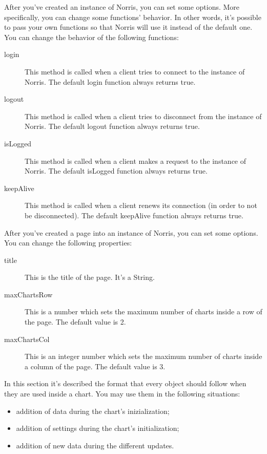  \label{sec:ObjectsDescription}
	 \label{sec:ObjectsDescriptionNorris}
		After you've created an instance of Norris, you can set some options. More specifically, you can change some functions' behavior. In other words, it's possible to pass your own functions so that Norris will use it instead of the default one.\\
		You can change the behavior of the following functions:
		\begin{description}
			\item[login] This method is called when a client tries to connect to the instance of Norris. The default login function always returns true.
			\item[logout] This method is called when a client tries to disconnect from the instance of Norris. The default logout function always returns true.
			\item[isLogged] This method is called when a client makes a request to the instance of Norris. The default isLogged function always returns true.
			\item[keepAlive] This method is called when a client renews its connection (in order to not be disconnected). The default keepAlive function always returns true.
		\end{description}
		After you've created a page into an instance of Norris, you can set some options. You can change the following properties:
		\begin{description}
			\item[title] This is the title of the page. It's a String.
			\item[maxChartsRow] This is a number which sets the maximum number of charts inside a row of the page. The default value is 2.
			\item[maxChartsCol] This is an integer number which sets the maximum number of charts inside a column of the page. The default value is 3.
		\end{description}
	 \label{sec:ObjectsDescriptionCharts}
		In this section it's described the format that every  object should follow when they are used inside a chart. You may use them in the following situations:
		\begin{itemize}
			\item addition of data during the chart's inizialization;
			\item addition of settings during the chart's initialization;
			\item addition of new data during the different updates.
		\end{itemize}

